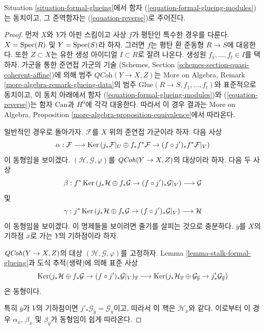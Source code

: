 \begin{proposition}
\label{proposition-formal-glueing-modules}
Situation \ref{situation-formal-glueing}에서 함자
(\ref{equation-formal-glueing-modules})는 동치이고, 그 준역함자는
(\ref{equation-reverse})로 주어진다.
\end{proposition}

\begin{proof}
먼저 $X$와 $Y$가 아핀 스킴이고 사상 $f$가 평탄인 특수한 경우를
다룬다. $X = \mathop{\mathrm{Spec}}(R)$ 및 $Y = \mathop{\mathrm{Spec}}(S)$라 하자. 그러면 $f$는
평탄 환 준동형 $R \to S$에 대응한다. 또한 $Z \subset X$는 유한 생성
아이디얼 $I \subset R$로 잘려 나온다. 생성원
$f_1, \ldots, f_t \in I$를 택하자. 가군을 통한 준연접 가군의 기술
(Schemes, Section \ref{schemes-section-quasi-coherent-affine})에 의해
범주 $\textit{QCoh}(Y \to X, Z)$는 More on Algebra, Remark
\ref{more-algebra-remark-glueing-data}의 범주
$\text{Glue}(R \to S, f_1, \ldots, f_t)$와 표준적으로 동치이고,
이 동치 아래에서 함자 (\ref{equation-formal-glueing-modules})와
(\ref{equation-reverse})는 함자 $\text{Can}$과 $H^0$에 각각 대응한다.
따라서 이 경우 결과는 More on Algebra, Proposition
\ref{more-algebra-proposition-equivalence}에서 따라온다.

\medskip\noindent
일반적인 경우로 돌아가자. $\mathcal{F}$를 $X$ 위의 준연접 가군이라 하자.
다음 사상
$$
\alpha :
\mathcal{F}
\longrightarrow
\mathop{\mathrm{Ker}}\left(j_*\mathcal{F}|_U \oplus f_*f^*\mathcal{F} \to
(f \circ j')_*f^*\mathcal{F}|_V\right)
$$
이 동형임을 보이겠다. $(\mathcal{H}, \mathcal{G}, \varphi)$를
$\mathit{QCoh}(Y \to X, Z)$의 대상이라 하자. 다음 두 사상
$$
\beta :
f^*\mathop{\mathrm{Ker}}\left(
j_*\mathcal{H} \oplus f_*\mathcal{G} \to (f \circ j')_*\mathcal{G}|_V
\right)
\longrightarrow
\mathcal{G}
$$
및
$$
\gamma :
j^*\mathop{\mathrm{Ker}}\left(
j_*\mathcal{H} \oplus f_*\mathcal{G} \to (f \circ j')_*\mathcal{G}|_V
\right)
\longrightarrow
\mathcal{H}
$$
이 동형임을 보이겠다. 이 명제들을 보이려면 줄기를 살피는 것으로 충분하다.
$\overline{y}$를 $X$의 기하점 $\overline{x}$로 가는 $Y$의 기하점이라 하자.

\medskip\noindent
$\mathit{QCoh}(Y \to X, Z)$의 대상
$(\mathcal{H}, \mathcal{G}, \varphi)$를 고정하자. Lemma
\ref{lemma-stalk-formal-glueing}과 도식 추적(생략)에 의해 표준 사상
$$
\mathop{\mathrm{Ker}}(j_*\mathcal{H} \oplus f_*\mathcal{G} \to
(f \circ j')_*\mathcal{G}|_V)_{\overline{x}}
\longrightarrow
\mathop{\mathrm{Ker}}(
j_*\mathcal{H}_{\overline{x}} \oplus \mathcal{G}_{\overline{y}}
\to
j'_*\mathcal{G}_{\overline{y}}
)
$$
은 동형이다.

\medskip\noindent
특히 $\overline{y}$가 $V$의 기하점이면
$j'_*\mathcal{G}_{\overline{y}} = \mathcal{G}_{\overline{y}}$이고,
따라서 이 핵은 $\mathcal{H}_{\overline{x}}$와 같다. 이로부터 이 경우
$\alpha_{\overline{x}}$, $\beta_{\overline{x}}$ 및
$\beta_{\overline{y}}$가 동형임이 쉽게 따라온다.


\end{proof}

